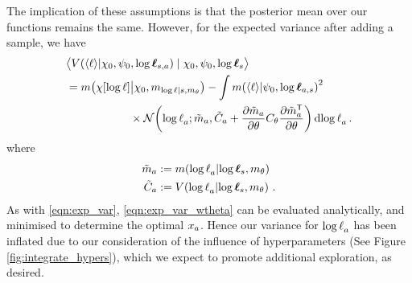 \documentclass{article}
\begin{document}
The implication of these assumptions is that the posterior mean over our functions remains the same.
However, for the expected variance after adding a sample, we have
\begin{align}\label{eqn:exp_var_wtheta}
& \bigl\langle \cov{\inty{\lfn}}{\chi_0,\psi_0,\tvr_{s,a}}\mid \chi_0,\psi_0,\tvr_{s}\bigr\rangle
\nonumber\\
& =  \mean{\chi[\tr]}{\chi_0,m_{\tr|s,m_\theta}}  - 
\int\mean{\inty{\lfn}}{\psi_0,\tvr_{a,s}}^2
\nonumber\\
& \hspace{2cm}
\times\N{\tr_a}
{\tilde{m}_a }
{\tilde{C}_a +\pderiv{\tilde{m}_a}{\theta}C_\theta\pderiv{\tilde{m}\tra_a}{\theta}}
\ud\tr_a\,.
\end{align}
where
\begin{align*}
\tilde{m}_a & \deq \mean{\tr_a}{\tvr_s,m_\theta}\\
\tilde{C}_a & \deq \cov{\tr_a}{\tvr_s,m_\theta}\,.
\end{align*}
As with \eqref{eqn:exp_var}, \eqref{eqn:exp_var_wtheta} can be evaluated analytically, and minimised to determine the optimal $\lfv_a$.
Hence our variance for $\tr_a$ has been inflated due to our consideration of the influence of hyperparameters (See Figure \ref{fig:integrate_hypers}), which we expect to promote additional exploration, as desired.
\end{document}
